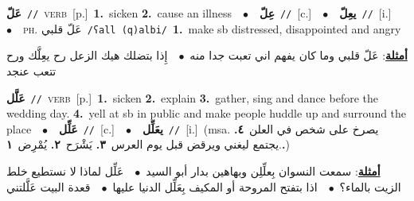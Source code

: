 \documentclass[10pt,a4paper,twoside]{article} %
\begin{document}
\begin{multicols}{2}
{\setlength\topsep{0pt}\textbf{\foreignlanguage{arabic}{عَلّ}}\ {\color{gray}\texttt{//}\color{black}}\ \textsc{verb}\ [p.]\ \textbf{1.}~sicken  \textbf{2.}~cause an illness\ \ $\bullet$\ \ \setlength\topsep{0pt}\textbf{\foreignlanguage{arabic}{عِلّ}}\ {\color{gray}\texttt{//}\color{black}}\ [c.]\ \ $\bullet$\ \ \setlength\topsep{0pt}\textbf{\foreignlanguage{arabic}{يعِلّ}}\ {\color{gray}\texttt{//}\color{black}}\ [i.]\ \ $\bullet$\ \ \textsc{ph.} \color{gray} \foreignlanguage{arabic}{عَلّ قلبي}\color{black}\ {\color{gray}\texttt{/{\sffamily ʕall (q)albi}/}\color{black}}\ \textbf{1.}~make sb distressed, disappointed and angry\  \begin{flushright}\color{gray}\foreignlanguage{arabic}{\textbf{\underline{\foreignlanguage{arabic}{أمثلة}}}: عَلّ قلبي وما كان يفهم اني تعبت جدا منه\ $\bullet$\ \  إِذا بتضلك هيك الزعل رح يعِلَّك ورح تتعب عنجد}\end{flushright}\color{black}} \vspace{2mm}

{\setlength\topsep{0pt}\textbf{\foreignlanguage{arabic}{عَلَّل}}\ {\color{gray}\texttt{//}\color{black}}\ \textsc{verb}\ [p.]\ \textbf{1.}~sicken  \textbf{2.}~explain  \textbf{3.}~gather, sing and dance before the wedding day.  \textbf{4.}~yell at sb in public and make people huddle up and surround the place\ \ $\bullet$\ \ \setlength\topsep{0pt}\textbf{\foreignlanguage{arabic}{عَلِّل}}\ {\color{gray}\texttt{//}\color{black}}\ [c.]\ \ $\bullet$\ \ \setlength\topsep{0pt}\textbf{\foreignlanguage{arabic}{يعَلِّل}}\ {\color{gray}\texttt{//}\color{black}}\ [i.]\ \color{gray}(msa. \foreignlanguage{arabic}{يصرخ على شخص في العلن}~\foreignlanguage{arabic}{\textbf{٤.}}  .\foreignlanguage{arabic}{يجتمع ليغني ويرقض قبل يوم العرس}~\foreignlanguage{arabic}{\textbf{٣.}}  \foreignlanguage{arabic}{يَشْرَح}~\foreignlanguage{arabic}{\textbf{٢.}}  \foreignlanguage{arabic}{يُمْرِض}~\foreignlanguage{arabic}{\textbf{١.}})\color{black}\  \begin{flushright}\color{gray}\foreignlanguage{arabic}{\textbf{\underline{\foreignlanguage{arabic}{أمثلة}}}: سمعت النسوان بِعلِّلِن وبهاهين بدار أبو السيد\ $\bullet$\ \  عَلِّل لماذا لا نستطيع خلط الزيت بالماء؟\ $\bullet$\ \  اذا بتفتح المروحة أو المكيف بِعَلِّل الدنيا عليها\ $\bullet$\ \  قعدة البيت عَلَّلتني}\end{flushright}\color{black}} \vspace{2mm}


\end{multicols}
\end{document}

